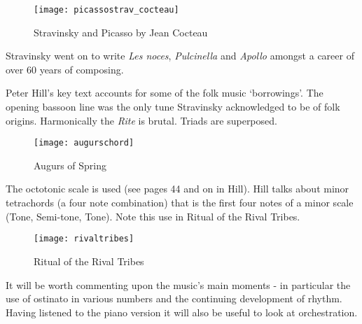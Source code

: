 \begin{figure}[H]
\centering
\texttt{[image: picassostrav\_cocteau]}\caption{Stravinsky and Picasso by Jean Cocteau}
\label{fig:stravpicasso_cocteau}
\end{figure}

Stravinsky went on to write \textit{Les noces}, \textit{Pulcinella} and \textit{Apollo} amongst a career of over 60 years of composing.  

Peter Hill's key text accounts for some of the folk music `borrowings'. The opening bassoon line was the only tune Stravinsky acknowledged to be of folk origins. Harmonically the \textit{Rite} is brutal. Triads are superposed. 

\begin{figure}[H]
\centering
\texttt{[image: augurschord]}\caption{Augurs of Spring}
\label{fig:augurschord}
\end{figure}

The octotonic scale is used (see pages 44 and on in Hill). Hill talks about minor tetrachords (a four note combination) that is the first four notes of a minor scale (Tone, Semi-tone, Tone). Note this use in Ritual of the Rival Tribes.

\begin{figure}[H]
\centering
\texttt{[image: rivaltribes]}\caption{Ritual of the Rival Tribes}
\label{fig:rivaltribes}
\end{figure}

It will be worth commenting upon the music's main moments - in particular the use of ostinato in various numbers and the continuing development of rhythm. Having listened to the piano version it will also be useful to look at orchestration. 





